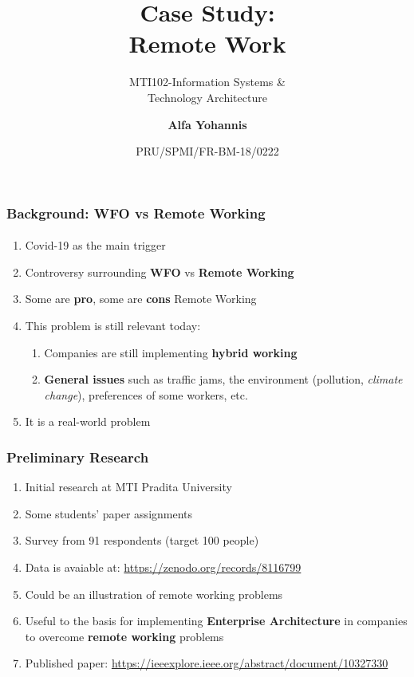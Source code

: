 \documentclass[aspectratio=169, table]{beamer}
\subtitle{MTI102-Information Systems \&\\Technology Architecture}
\title{Case Study:\\Remote Work}
\date[Serial]{\scriptsize {PRU/SPMI/FR-BM-18/0222}}
\author[Pradita]{\small {\textbf{Alfa Yohannis}}}
\begin{document}
    \frame{\titlepage}

    \begin{frame}
        \frametitle{Background: WFO vs Remote Working}
        \framesubtitle{\hspace{1cm}}
        \begin{enumerate}
            \item Covid-19 as the main trigger
            \item Controversy surrounding \textbf{WFO} vs \textbf{Remote Working}
            \item Some are \textbf{pro}, some are \textbf{cons} Remote Working
            \item This problem is still relevant today:
            \begin{enumerate}
                \item Companies are still implementing \textbf{hybrid working}
                \item \textbf{General issues} such as traffic jams, the environment (pollution, \textit{climate change}), preferences of some workers, etc.
            \end{enumerate}
            \item It is a real-world problem
        \end{enumerate}
    \end{frame}



    \begin{frame}
        \frametitle{Preliminary Research}
        \begin{enumerate}
            \item Initial research at MTI Pradita University
            \item Some students' paper assignments
            \item Survey from 91 respondents (target 100 people)
            \item Data is avaiable at: \url{https://zenodo.org/records/8116799}
            \item Could be an illustration of remote working problems
            \item Useful to the basis for implementing \textbf{Enterprise Architecture} in companies to overcome \textbf{remote working} problems
            \item Published paper: \url{https://ieeexplore.ieee.org/abstract/document/10327330}
        \end{enumerate}
    \end{frame}
\end{document}

